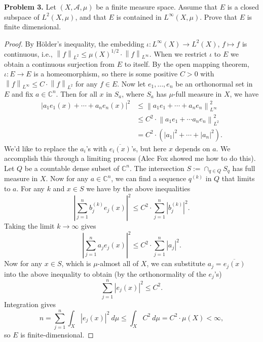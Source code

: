 \documentclass[11pt,letterpaper]{report}
\newcommand{\complex}{\mathbb{C}}
\newcommand{\mcal}[1]{\mathcal{#1}}
\newcommand{\Lp}[2]{\left\|{#1}\right\|_{L^{#2}}}
\begin{document}
\noindent\textbf{Problem 3. }
Let $(X, \mcal{A}, \mu)$ be a finite measure space. Assume that $E$ is a closed subspace of $L^2(X, \mu)$, and that $E$ is contained in $L^\infty(X, \mu)$. Prove that $E$ is finite dimensional.
\begin{proof}
	By H\"older's inequality, the embedding $\iota: L^\infty(X)\to L^2(X)$, $f\mapsto f$ is continuous, i.e., $\Lp{f}{2}\leq \mu(X)^{1/2}\cdot \Lp{f}{\infty}$. When we restrict $\iota$ to $E$ we obtain a continuous surjection from $E$ to itself. By the open mapping theorem, $\iota:E\to E$ is a homeomorphism, so there is some positive $C>0$ with $\Lp{f}{\infty}\leq C\cdot \Lp{f}{2}$ for any $f\in E$. Now let $e_1, \ldots, e_n$ be an orthonormal set in $E$ and fix $a\in \complex^n$. Then for all $x$ in $S_a$, where $S_a$ has $\mu$-full measure in $X$, we have 
	\begin{align*}
	|a_1e_1(x) + \cdots + a_ne_n(x)|^2 &\leq \Lp{a_1e_1 + \cdots + a_ne_n}{\infty}^2\\
	&\leq C^2\cdot \Lp{a_1e_1 + \cdots a_ne_n}{2}^2\\
	&= C^2\cdot(|a_1|^2 + \cdots + |a_n|^2).
	\end{align*}
	We'd like to replace the $a_i$'s with $\overline{e_i(x)}$'s, but here $x$ depends on $a$. We accomplish this through a limiting process (Alec Fox showed me how to do this).\\

	\noindent Let $Q$ be a countable dense subset of $\complex^n$. The intersection $S := \cap_{q\in Q}S_q$ has full measure in $X$. Now for any $a\in \complex^n$, we can find a sequence $q^{(k)}$ in $Q$ that limits to $a$. For any $k$ and $x\in S$ we have by the above inequalities
	\[
	\left|\sum_{j=1}^nb_j^{(k)}e_j(x)\right|^2 \leq C^2\cdot \sum_{j=1}^n|b_j^{(k)}|^2.
	\]
	Taking the limit $k\to \infty$ gives
	\[
	\left|\sum_{j=1}^na_je_j(x)\right|^2 \leq C^2\cdot \sum_{j=1}^n|a_j|^2.
	\]
	Now for any $x\in S$, which is $\mu$-almost all of $X$, we can substitute $a_j = \overline{e_j(x)}$ into the above inequality to obtain (by the orthonormality of the $e_j$'s)
	\[
	\sum_{j=1}^n|e_j(x)|^2 \leq C^2.
	\]
	Integration gives
	\[
	n = \sum_{j=1}^n\int_X|e_j(x)|^2\ d\mu \leq \int_XC^2\ d\mu = C^2\cdot \mu(X)<\infty,
	\]
	so $E$ is finite-dimensional.
\end{proof}
\end{document}
